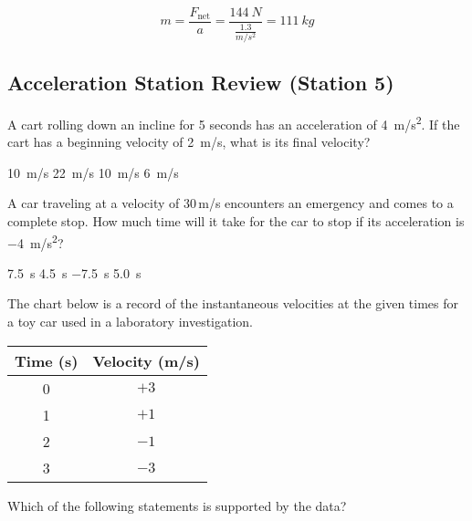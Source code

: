 \documentclass[../main-physics-problems.tex]{subfiles}
\begin{document}
\begin{questions}
\begin{parts}
\begin{solution}
\begin{equation*}
    m = \frac{F_\mathrm{net}}{a} = \frac{\SI{144}{N}}{\frac{1.3}{m/s^2}} = \boxed{\SI{111}{kg}}
\end{equation*}
\end{solution}
\end{parts}

\clearpage

\begin{EnvUplevel}
    \subsection*{Acceleration Station Review (Station 5)}
\end{EnvUplevel}

\question
A cart rolling down an incline for 5 seconds has an acceleration of \SI{4}{m/s^2}.  If the cart has a beginning velocity of \SI{2}{m/s}, what is its final velocity?

\begin{randomizechoices}
    \choice \SI{10}{m/s}
    \correctchoice \SI{22}{m/s}
    \choice \SI{10}{m/s}
    \choice \SI{6}{m/s}
\end{randomizechoices}

\question
A car traveling at a velocity of 30\,m/s encounters an emergency and comes to a complete stop.  How much time will it take for the car to stop if its acceleration is \SI{-4}{m/s^2}?

\begin{randomizechoices}
    \correctchoice \SI{7.5}{s}
    \choice \SI{4.5}{s}
    \choice \SI{-7.5}{s}
    \choice \SI{5.0}{s}
\end{randomizechoices}

\question
The chart below is a record of the instantaneous velocities at the given times for a toy car used in a laboratory investigation.

\begin{center}
    \begin{tabular}{c|c}
        \textbf{Time} (s) & \textbf{Velocity} (m/s) \\ \hline
        0 & $+3$ \\
        1 & $+1$ \\
        2 & $-1$ \\
        3 & $-3$ \\
    \end{tabular}
\end{center}

Which of the following statements is supported by the data?


\end{questions}
\end{document}
